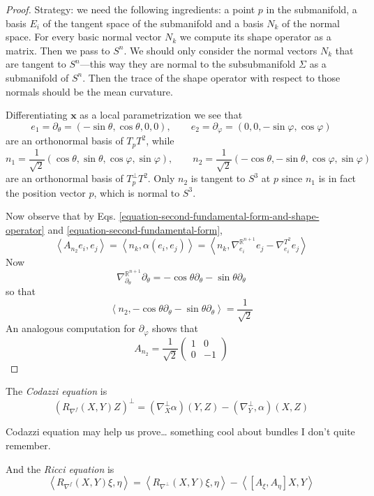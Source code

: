 \begin{proof}
Strategy: we need the following ingredients: a point $p$ in the submanifold, a
basis $E_i$ of the tangent space of the submanifold and a basis $N_k$ of the
normal space. For every basic normal vector $N_k$ we compute its shape operator
as a matrix. Then we pass to $S^n$. We should only consider the normal vectors
$N_k$ that are tangent to $S^n$---this way they are normal to the subsubmanifold
$\Sigma$ as a submanifold of $S^n$. Then the trace of the shape operator with
respect to those normals should be the mean curvature.

Differentiating $\mathbf{x}$ as a local parametrization we see that
$$
e_1=\partial_\theta=(-\sin\theta,\cos\theta,0,0),\qquad 
e_2=\partial_\varphi=(0,0,-\sin\varphi,\cos\varphi)
$$
are an orthonormal basis of $T_pT^2$, while
$$
n_1=\frac{1}{\sqrt{2}}(\cos\theta,\sin\theta,\cos\varphi,\sin\varphi),
\qquad n_2=\frac{1}{\sqrt{2}}(-\cos\theta,-\sin\theta,\cos\varphi,\sin\varphi)
$$
are an orthonormal basis of $T_p^\perp T^2$. Only $n_2$ is tangent to $S^3$ at 
$p$ since $n_1$ is in fact the position vector $p$, which is normal to $S^3$.

Now observe that by Eqs.
\ref{equation-second-fundamental-form-and-shape-operator} and
\ref{equation-second-fundamental-form},
$$
\left<A_{n_2}e_i,e_j\right>=\left<n_k,\alpha(e_i,e_j)\right>
=\left<n_k,\nabla^{\mathbb{R}^{n+1}}_{e_i}e_j
-\nabla^{T^2}_{e_i}e_j\right>
$$
Now
$$
\nabla^{\mathbb{R}^{n+1}}_{\partial_\theta}\partial_\theta=
-\cos\theta\partial_\theta-\sin\theta\partial_\theta
$$
so that
$$
\left<n_2,-\cos\theta\partial_\theta-\sin\theta\partial_\theta\right>
=\frac{1}{\sqrt{2}}
$$
An analogous computation for $\partial_\varphi$ shows that
$$
A_{n_2}=\frac{1}{\sqrt{2}}\begin{pmatrix}
1&0\\ 
0&-1
\end{pmatrix}
$$
\end{proof}

The {\it Codazzi equation} is
\begin{equation}
\label{equation-Codazzi}
(R_{\nabla^f}(X,Y)Z)^\perp
=(\nabla^\perp_X\alpha)(Y,Z)-(\nabla^\perp_Y,\alpha)(X,Z)
\end{equation}

Codazzi equation may help us prove… something cool about bundles I don't quite
remember.

And the {\it Ricci equation} is
\begin{equation}
\label{equation-Ricc}
\left<R_{\nabla^f}(X,Y)\xi,\eta\right>
=\left<R_{\nabla^\perp}(X,Y)\xi,\eta\right>
-\left<[A_\xi,A_\eta]X,Y\right>
\end{equation}

